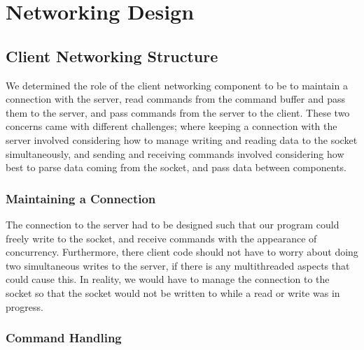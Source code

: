 \section{Networking Design}

\subsection{Client Networking Structure}

We determined the role of the client networking component to be to maintain a connection with the server, read commands from the command buffer and pass them to the server, and pass commands from the server to the client. These two concerns came with different challenges; where keeping a connection with the server involved considering how to manage writing and reading data to the socket simultaneously, and sending and receiving commands involved considering how best to parse data coming from the socket, and pass data between components.

\subsubsection {Maintaining a Connection}

The connection to the server had to be designed such that our program could freely write to the socket, and receive commands with the appearance of concurrency. Furthermore, there client code should not have to worry about doing two simultaneous writes to the server, if there is any multithreaded aspects that could cause this. In reality, we would have to manage the connection to the socket so that the socket would not be written to while a read or write was in progress. 



\subsubsection {Command Handling }










